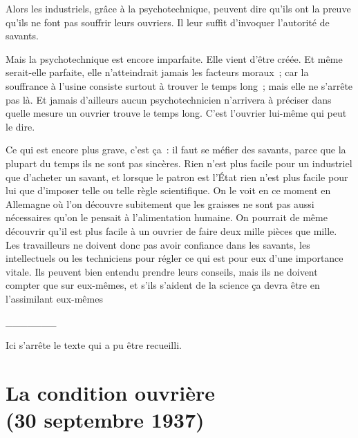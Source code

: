 \documentclass[french,twoside]{book} %
\begin{document}
Alors les industriels, grâce à la psychotechnique, peuvent dire qu'ils ont la preuve qu'ils ne font pas souffrir leurs ouvriers. Il leur suffit d'invoquer l'autorité de savants.\par
Mais la psychotechnique est encore imparfaite. Elle vient d'être créée. Et même serait-elle parfaite, elle n'atteindrait jamais les facteurs moraux ; car la souffrance à l'usine consiste surtout à trouver le temps long ; mais elle ne s'arrête pas là. Et jamais d'ailleurs aucun psychotechnicien n'arrivera à préciser dans quelle mesure un ouvrier trouve le temps long. C'est l'ouvrier lui-même qui peut le dire.\par
Ce qui est encore plus grave, c'est ça : il faut se méfier des savants, parce que la plupart du temps ils ne sont pas sincères. Rien n'est plus facile pour un industriel que d'acheter un savant, et lorsque le patron est l'État rien n'est plus facile pour lui que d'imposer telle ou telle règle scientifique. On le voit en ce moment en Allemagne où l'on découvre subitement que les graisses ne sont pas aussi nécessaires qu'on le pensait à l'alimentation humaine. On pourrait de même découvrir qu'il est plus facile à un ouvrier de faire deux mille pièces que mille. Les travailleurs ne doivent donc pas avoir confiance dans les savants, les intellectuels ou les techniciens pour régler ce qui est pour eux d'une importance vitale. Ils peuvent bien entendu prendre leurs conseils, mais ils ne doivent compter que sur eux-mêmes, et s'ils s'aident de la science ça devra être en l'assimilant eux-mêmes\par

\begin{center}
\_\_\_\_\_\_\_\end{center}
\noindent Ici s'arrête le texte qui a pu être recueilli.
\section[La condition ouvrière, (30 septembre 1937)]{La condition ouvrière \\
(30 septembre 1937)}\renewcommand{\leftmark}{La condition ouvrière \\
(30 septembre 1937)}
\end{document}
